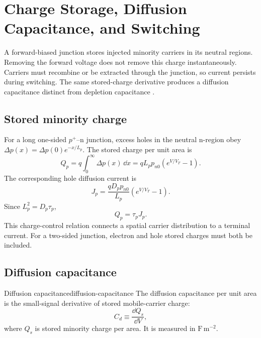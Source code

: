 \chapter{Charge Storage, Diffusion Capacitance, and Switching}
\label{ch:charge-storage-switching}

A forward-biased junction stores injected minority carriers in its neutral
regions.  Removing the forward voltage does not remove this charge
instantaneously.  Carriers must recombine or be extracted through the junction,
so current persists during switching.  The same stored-charge derivative
produces a diffusion capacitance distinct from depletion capacitance
\cite[Chap.~3, Sec.~3.5]{szeLee2012}.

\section{Stored minority charge}

For a long one-sided $p^+$--n junction, excess holes in the neutral n-region
obey $\Delta p(x)=\Delta p(0)e^{-x/L_p}$.  The stored charge per unit area is
\begin{equation}
 Q_p=q\int_0^\infty\Delta p(x)\,\dd x
 =qL_p p_{n0}(e^{V/V_T}-1).
 \label{eq:stored-minority-charge}
\end{equation}
The corresponding hole diffusion current is
\begin{equation}
 J_p=\frac{qD_pp_{n0}}{L_p}(e^{V/V_T}-1).
 \label{eq:stored-charge-current}
\end{equation}
Since $L_p^2=D_p\tau_p$,
\begin{equation}
 \boxed{Q_p=\tau_pJ_p.}
 \label{eq:charge-control-relation}
\end{equation}
This charge-control relation connects a spatial carrier distribution to a
terminal current.  For a two-sided junction, electron and hole stored charges
must both be included.

\section{Diffusion capacitance}

\begin{definition}{Diffusion capacitance}{diffusion-capacitance}
The diffusion capacitance per unit area is the small-signal derivative of
stored mobile-carrier charge:
\begin{equation}
 C_d\equiv\frac{\dd Q_s}{\dd V},
 \label{eq:diffusion-capacitance-definition}
\end{equation}
where $Q_s$ is stored minority charge per area.  It is measured in
$\mathrm{F\,m^{-2}}$.
\end{definition}


